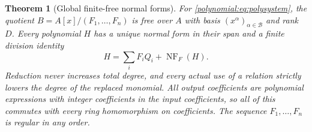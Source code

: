 \documentclass[11pt,letterpaper]{article}
\numberwithin{equation}{section}
\newtheorem{theorem}{Theorem}[section]
\theoremstyle{definition}
\theoremstyle{remark}\newtheorem{remark}[theorem]{Remark}
\newcommand{\NF}{\operatorname{NF}}
\begin{document}
\begin{theorem}[Global finite-free normal forms]\label{polynomial:thm:globalfree}
For \eqref{polynomial:eq:polysystem}, the quotient
$B=A[x]/(F_1,\ldots,F_n)$ is free over $A$ with basis
$(x^\alpha)_{\alpha\in\mathcal B}$ and rank $D$. Every polynomial $H$ has a
unique normal form in their span and a finite division identity
\begin{equation}\label{polynomial:eq:globalnf}
 H=\sum_iF_iQ_i+\NF_F(H).
\end{equation}
Reduction never increases total degree, and every actual use of a relation
strictly lowers the degree of the replaced monomial. All output coefficients
are polynomial expressions with integer coefficients in the input
coefficients, so all of this commutes with every ring homomorphism on
coefficients. The sequence $F_1,\ldots,F_n$ is regular in any order.
\end{theorem}
\end{document}
